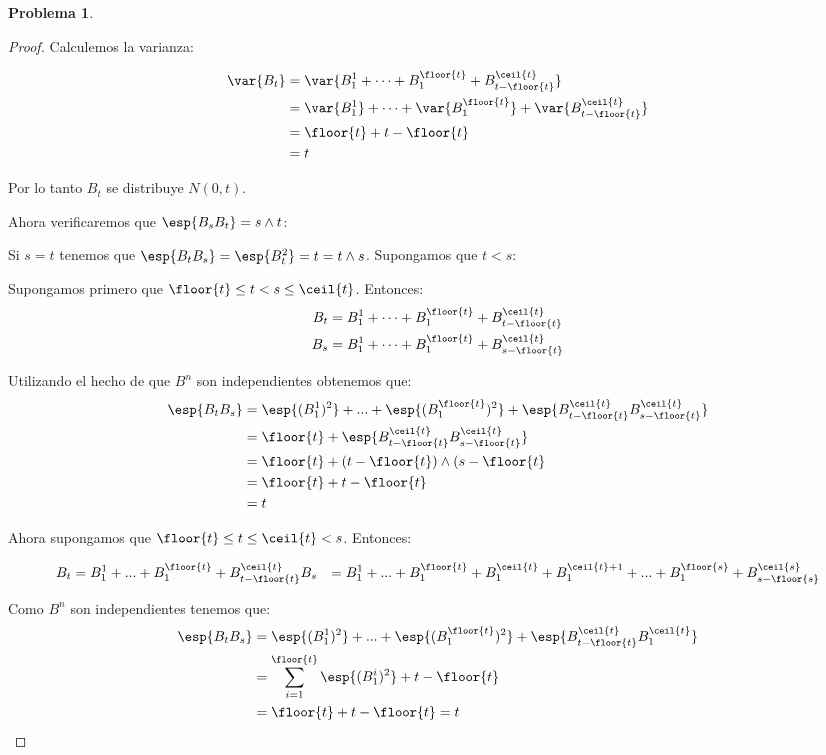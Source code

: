 \documentclass[a5paper,oneside]{amsart}
\theoremstyle{plain}
\theoremstyle{definition}
\newtheorem{problema}{Problema}
\begin{document}
\begin{problema}
\begin{enumerate}
\begin{proof}
Calculemos la varianza:

\begin{align}
\var{B_t}&=\var{B^1_1+\cdots+B^{\floor{t}}_1+B^{\ceil{t}}_{t-\floor{t}}}\notag \\
&=\var{B^1_1}+\cdots+\var{B^{\floor{t}}_1}+\var{B^{\ceil{t}}_{t-\floor{t}}} \notag \\
&=\floor{t}+t-\floor{t}\notag \\
&=t\notag
\end{align}

Por lo tanto $B_t$ se distribuye $N(0,t)$.

Ahora verificaremos que $\esp{B_sB_t}=s\wedge t$:

Si $s=t$ tenemos que $\esp{B_tB_s}=\esp{B_t^2}=t=t\wedge s$.
Supongamos que $t<s$:

Supongamos primero que $\floor{t}\leq t<s\leq\ceil{t}$. Entonces:
\begin{align}
B_t&=B^1_1+\cdots+B^{\floor{t}}_1+B^{\ceil{t}}_{t-\floor{t}}\notag \\
B_s&=B^1_1+\cdots+B^{\floor{t}}_1+B^{\ceil{t}}_{s-\floor{t}}\notag
\end{align}

Utilizando el hecho de que $B^n$ son independientes obtenemos que:
\begin{align}
\esp{B_tB_s}&=\esp{(B^1_1)^2}+...+\esp{(B^{\floor{t}}_1)^2}+\esp{B^{\ceil{t}}_{t-\floor{t}}B^{\ceil{t}}_{s-\floor{t}}}\notag \\
&=\floor{t}+\esp{B^{\ceil{t}}_{t-\floor{t}}B^{\ceil{t}}_{s-\floor{t}}} \notag \\
&=\floor{t}+(t-\floor{t})\wedge(s-\floor{t}\notag \\
&=\floor{t}+t-\floor{t} \notag \\
&=t\notag
\end{align}

Ahora supongamos que $\floor{t}\leq t\leq\ceil{t}< s$. Entonces:

\begin{align}
B_t&=B^1_1+...+B^{\floor{t}}_1+B^{\ceil{t}}_{t-\floor{t}}\notag
B_s&=B^1_1+...+B^{\floor{t}}_1+B^{\ceil{t}}_1+B^{\ceil{t}+1}_1+...+B^{\floor{s}}_1+B^{\ceil{s}}_{s-\floor{s}}\notag \\
\end{align}

Como $B^n$ son independientes tenemos que:
\begin{align}
\esp{B_tB_s}&=\esp{(B^1_1)^2}+...+\esp{(B^{\floor{t}}_1)^2}+\esp{B^{\ceil{t}}_{t-\floor{t}}B^{\ceil{t}}_{1} }\notag \\
&=\sum_{i=1}^{\floor{t}}\esp{(B^i_1)^2}+t-\floor{t}\notag \\
&=\floor{t}+t-\floor{t}\notag
=t\notag
\end{align}


\end{proof}
\end{enumerate}
\end{problema}
\end{document}
